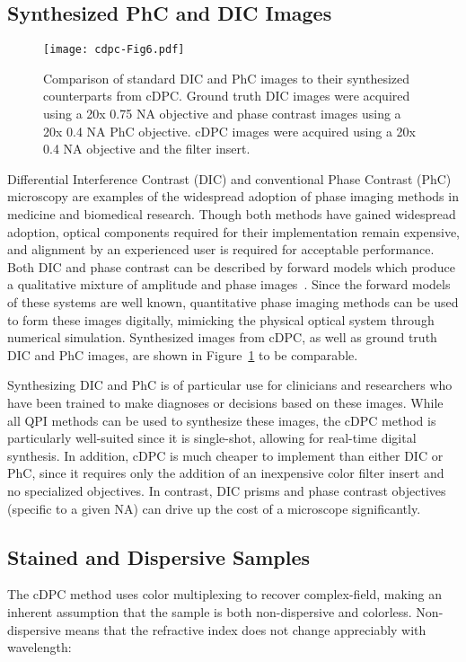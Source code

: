\subsection{Synthesized PhC and DIC Images}

\begin{figure}[tbh]
\centering
\texttt{[image: cdpc-Fig6.pdf]}
\caption{\label{fig:synthDIC_PC}
Comparison of standard DIC and PhC images to their synthesized counterparts from cDPC. Ground truth DIC images were acquired using a 20x 0.75 NA objective and phase contrast images using a 20x 0.4 NA PhC objective. cDPC images were acquired using a 20x 0.4 NA objective and the filter insert.}\end{figure}

Differential Interference Contrast (DIC) and conventional Phase Contrast (PhC) microscopy are examples of the widespread adoption of phase imaging methods in medicine and biomedical research. Though both methods have gained widespread adoption, optical components required for their implementation remain expensive, and alignment by an experienced user is required for acceptable performance. Both DIC and phase contrast can be described by forward models which produce a qualitative mixture of amplitude and phase images~\cite{zernike1942phase, smithDIC}. Since the forward models of these systems are well known, quantitative phase imaging methods can be used to form these images digitally, mimicking the physical optical system through numerical simulation. Synthesized images from cDPC, as well as ground truth DIC and PhC images, are shown in Figure~\ref{fig:synthDIC_PC} to be comparable.

Synthesizing DIC and PhC is of particular use for clinicians and researchers who have been trained to make diagnoses or decisions based on these images. While all QPI methods can be used to synthesize these images, the cDPC method is particularly well-suited since it is single-shot, allowing for real-time digital synthesis. In addition, cDPC is much cheaper to implement than either DIC or PhC, since it requires only the addition of an inexpensive color filter insert and no specialized objectives. In contrast, DIC prisms and phase contrast objectives (specific to a given NA) can drive up the cost of a microscope significantly.

\subsection{Stained and Dispersive Samples}
The cDPC method uses color multiplexing to recover complex-field, making an inherent assumption that the sample is both non-dispersive and colorless. Non-dispersive means that the refractive index does not change appreciably with wavelength:

